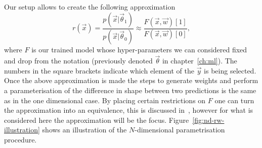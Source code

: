 Our setup allows to create the following approximation
\begin{equation}
  r(\vec{x}) =  \frac{p(\vec{x}|\vec{\theta}_{1})}{p(\vec{x}|\vec{\theta}_{0})}
  \approx \frac{F(\vec{x}, \vec{w})[1]}{F(\vec{x}, \vec{w})[0]},
  \label{eq:bdtr-approximation}
\end{equation}
where $F$ is our trained model whose hyper-parameters we can considered fixed
and drop from the notation (previously denoted $\vec{\theta}$ in
chapter~\ref{ch:ml}). The numbers in the square brackets indicate which element
of the $\vec{y}$ is being selected. Once the above approximation is made the
steps to generate weights and perform a parameterisation of the difference in
shape between two predictions is the same as in the one dimensional case. By
placing certain restrictions on $F$ one can turn the approximation into an
equivalence, this is discussed in~\cite{VHModellingNote2019}, however for what
is considered here the approximation will be the focus.
Figure~\ref{fig:nd-rw-illustration} shows an illustration of the $N$-dimensional
parametrisation procedure.



